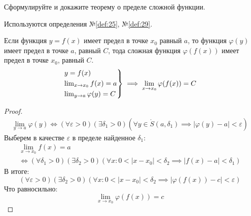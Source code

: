 \begin{question}
    Сформулируйте и докажите теорему о пределе сложной функции.
\end{question}
\begin{used}
    Используются определения №\ref{def:25}, №\ref{def:29}.
\end{used}
\begin{theorem}
    Если функция $y = f(x)$ имеет предел в точке  $x_0$ равный $a$, то функция  $\varphi(y)$ имеет предел в точке $a$, равный $C$, тода сложная функция  $\varphi(f(x))$ имеет предел в точке $x_0$, равный $C$.
    \begin{gather*}
        \begin{rcases}
            y = f(x) \\
            \lim_{x \to x_0} f(x) = a \\
            \lim_{y \to a} \varphi(y) = C \\
        \end{rcases}
        \implies \lim_{x \to x_0} \varphi(f(x)) = C
    \end{gather*}
\end{theorem}
\begin{proof}
    \begin{gather*}
        \lim_{y \to a} \varphi(y) \iff (\forall \varepsilon > 0)(\exists \delta_1 > 0)(\forall y \in \mathring{S}(a, \delta_1) \implies |\varphi(y) - a| < \varepsilon) \tag{1}
    \end{gather*}
    Выберем в качестве $\varepsilon$ в пределе найденное $\delta_1$:
    \begin{gather*}
        \lim_{x \to x_0} f(x) = a \\
        \iff (\forall \delta_1 > 0)(\exists \delta_2 > 0)(\forall x: 0 < |x - x_0| < \delta_2 \implies |f(x) - a| < \delta_1) \tag{2} 
    \end{gather*}
    В итоге: \[
        (\forall \varepsilon > 0)(\exists \delta_2 > 0)(\forall x: 0 < |x - x_0| < \delta_2 \implies |\varphi(f(x)) - c| < \varepsilon)
    \] 
    Что равносильно: \[
        \lim_{x \to x_0} \varphi(f(x)) = c
    \] 
\end{proof}
\pagebreak



